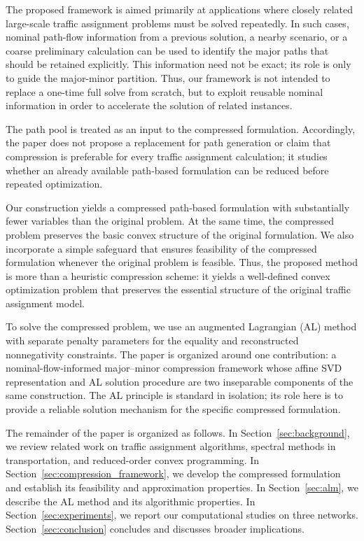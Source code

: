 \documentclass[11pt]{article}
\begin{document}
The proposed framework is aimed primarily at applications where closely related large-scale traffic assignment problems must be solved repeatedly. In such cases, nominal path-flow information from a previous solution, a nearby scenario, or a coarse preliminary calculation can be used to identify the major paths that should be retained explicitly. This information need not be exact; its role is only to guide the major-minor partition. Thus, our framework is not intended to replace a one-time full solve from scratch, but to exploit reusable nominal information in order to accelerate the solution of related instances.\par
{\color{red}The path pool is treated as an input to the compressed formulation. Accordingly, the paper does not propose a replacement for path generation or claim that compression is preferable for every traffic assignment calculation; it studies whether an already available path-based formulation can be reduced before repeated optimization.}

Our construction yields a compressed path-based formulation with substantially fewer variables than the original problem. At the same time, the compressed problem preserves the basic convex structure of the original formulation. We also incorporate a simple safeguard that ensures feasibility of the compressed formulation whenever the original problem is feasible. Thus, the proposed method is more than a heuristic compression scheme: it yields a well-defined convex optimization problem that preserves the essential structure of the original traffic assignment model.

{\color{red}To solve the compressed problem, we use an augmented Lagrangian (AL) method with separate penalty parameters for the equality and reconstructed nonnegativity constraints. The paper is organized around one contribution: a nominal-flow-informed major--minor compression framework whose affine SVD representation and AL solution procedure are two inseparable components of the same construction. The AL principle is standard in isolation; its role here is to provide a reliable solution mechanism for the specific compressed formulation.}

The remainder of the paper is organized as follows. In Section~\ref{sec:background}, we review related work on traffic assignment algorithms, spectral methods in transportation, and reduced-order convex programming. In Section~\ref{sec:compression_framework}, we develop the compressed formulation and establish its feasibility and approximation properties. In Section~\ref{sec:alm}, we describe the AL method and its algorithmic properties. In Section~\ref{sec:experiments}, we report our computational studies on three networks. Section~\ref{sec:conclusion} concludes and discusses broader implications.
\end{document}
